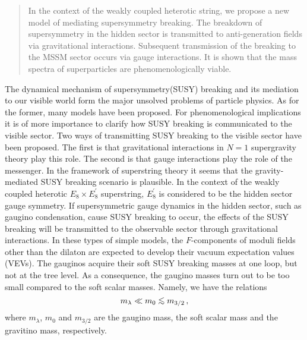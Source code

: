 \vspace{25mm}

\begin{abstract}
In the context of the weakly coupled heterotic string, 
we propose a new model of mediating supersymmetry breaking. 
The breakdown of supersymmetry in the hidden sector is transmitted 
to anti-generation fields via gravitational interactions. 
Subsequent transmission of the breaking to the MSSM sector 
occurs via gauge interactions. 
It is shown that the mass spectra of superparticles are 
phenomenologically viable.
\end{abstract} 

%

\newpage 

The dynamical mechanism of supersymmetry(SUSY) breaking and its 
mediation to our visible world form the major unsolved problems of 
particle physics. 
As for the former, many models have been proposed\cite{DSB}. 
For phenomenological implications it is of more importance to 
clarify how SUSY breaking is communicated to the visible sector. 
Two ways of transmitting SUSY breaking to the visible sector 
have been proposed. 
The first is that gravitational interactions in $N=1$ supergravity 
theory play this role\cite{SUGRA}. 
The second is that gauge interactions play the role of the
messenger\cite{GMSB}. 
In the framework of superstring theory it seems that 
the gravity-mediated SUSY breaking scenario is plausible. 
In the context of the weakly coupled heterotic 
$E_{8}\times E^{\prime}_{8}$ superstring, 
$E^{\prime}_{8}$ is considered to be the hidden sector gauge symmetry. 
If supersymmetric gauge dynamics in the hidden sector, 
such as gaugino condensation, cause SUSY breaking to occur, 
the effects of the SUSY breaking will be transmitted to the 
observable sector through gravitational interactions. 
In these types of simple models\cite{FTdomi}, 
the $F$-components of moduli fields other than the dilaton are expected 
to develop their vacuum expectation values (VEVs). 
The gauginos acquire their soft SUSY breaking masses 
at one loop, but not at the tree level. 
As a consequence, the gaugino masses turn out to be too 
small compared to the soft scalar masses. 
Namely, we have the relations 
\begin{equation}
      m_{\lambda} \ll m_{0} \lsim m_{3/2} \,, 
\label{eqn1}
\end{equation}
where $m_{\lambda}$, $m_{0}$ and $m_{3/2}$ are the gaugino mass, 
the soft scalar mass and the gravitino mass, respectively. 
